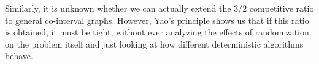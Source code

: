 Similarly, it is unknown whether we can actually extend the $3/2$ competitive ratio to general co-interval graphs. However, Yao's principle shows us that if this ratio is obtained, it must be tight, without ever analyzing the effects of randomization on the problem itself and just looking at how different deterministic algorithms behave.
